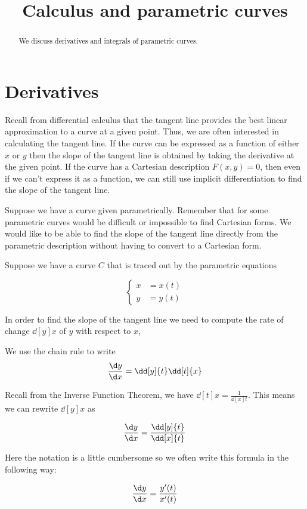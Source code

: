 \documentclass{ximera}
\title[Dig-In:]{Calculus and parametric curves}
\begin{document}
\begin{abstract}
  We discuss derivatives and integrals of parametric curves.  
\end{abstract}
\maketitle

\section{Derivatives}

Recall from differential calculus that the tangent line provides the best linear approximation to a curve at a given point. Thus, we are often interested in calculating the tangent line.   If the curve can be expressed as a function of either $x$ or $y$ then the slope of the tangent line is obtained by taking the derivative at the given point. If the curve has a Cartesian description $F(x,y)=0$, then even if we can't express it as a function, we can still use implicit differentiation to find the slope of the tangent line. 

Suppose we have a curve given parametrically. Remember that for some parametric curves would be difficult or impossible to find Cartesian forms. We would like to be able to find the slope of the tangent line directly from the parametric description without having to convert to a Cartesian form.


Suppose we have a curve $C$ that is traced out by the parametric equations 

\[ 
\begin{cases}
x&=x(t) \\
y&=y(t)
\end{cases}
\]

In order to find the slope of the tangent line we need to compute the rate of change  $\dd[y]{x}$ of $y$ with respect to $x$,

We use the chain rule to write 
\[
\frac{\d y}{\d x} = \dd[y]{t} \dd[t]{x}
\]

Recall from the Inverse Function Theorem, we have $\dd[t]{x}=\frac{1}{\dd[x]{t}}$. This means we can rewrite $\dd[y]{x}$ as 

\[
\frac{\d y}{\d x} = \frac{\dd[y]{t}}{ \dd[x]{t}}
\]

Here the notation is a little cumbersome so we often write this formula in the following way:

\[
\frac{\d y}{\d x} = \frac{ y'(t)}{x'(t)}
\]
\end{document}
